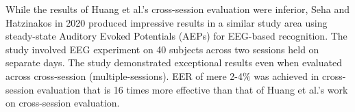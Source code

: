 
While the results of Huang et al.'s cross-session evaluation were inferior, Seha and Hatzinakos \cite{seha2020eeg} in 2020 produced impressive results in a similar study area using steady-state Auditory Evoked Potentials (AEPs) for EEG-based recognition. The study involved EEG experiment on 40 subjects across two sessions held on separate days. The study demonstrated exceptional results even when evaluated across cross-session (multiple-sessions). EER of mere 2-4$\%$ was achieved in cross-session evaluation that is 16 times more effective than that of Huang et al.'s work on cross-session evaluation. 

